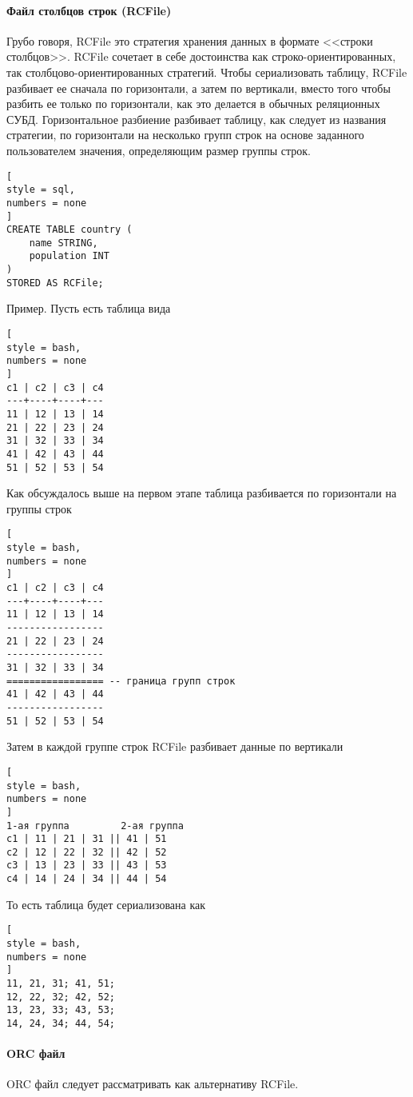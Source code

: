 \documentclass[%
	11pt,
	a4paper,
	utf8,
		]{article}
\begin{document}
\paragraph{Файл столбцов строк (RCFile)} Грубо говоря, RCFile это стратегия хранения данных в формате <<строки столбцов>>. RCFile сочетает в себе достоинства как строко-ориентированных, так столбцово-ориентированных стратегий. Чтобы сериализовать таблицу, RCFile разбивает ее сначала по горизонтали, а затем по вертикали, вместо того чтобы разбить ее только по горизонтали, как это делается в обычных реляционных СУБД. Горизонтальное разбиение разбивает таблицу, как следует из названия стратегии, по горизонтали на несколько групп строк на основе заданного пользователем значения, определяющим размер группы строк.
\begin{lstlisting}[
style = sql,
numbers = none	
]
CREATE TABLE country (
	name STRING,
	population INT
)
STORED AS RCFile;
\end{lstlisting}

Пример. Пусть есть таблица вида
\begin{lstlisting}[
style = bash,
numbers = none	
]
c1 | c2 | c3 | c4
---+----+----+---
11 | 12 | 13 | 14
21 | 22 | 23 | 24
31 | 32 | 33 | 34
41 | 42 | 43 | 44
51 | 52 | 53 | 54
\end{lstlisting}

Как обсуждалось выше на первом этапе таблица разбивается по горизонтали на группы строк
\begin{lstlisting}[
style = bash,
numbers = none	
]
c1 | c2 | c3 | c4
---+----+----+---
11 | 12 | 13 | 14
-----------------
21 | 22 | 23 | 24
-----------------
31 | 32 | 33 | 34
================= -- граница групп строк
41 | 42 | 43 | 44
-----------------
51 | 52 | 53 | 54
\end{lstlisting}

Затем в каждой группе строк RCFile разбивает данные по вертикали
\begin{lstlisting}[
style = bash,
numbers = none	
]
1-ая группа         2-ая группа
с1 | 11 | 21 | 31 || 41 | 51
c2 | 12 | 22 | 32 || 42 | 52
c3 | 13 | 23 | 33 || 43 | 53
c4 | 14 | 24 | 34 || 44 | 54
\end{lstlisting}

То есть таблица будет сериализована как
\begin{lstlisting}[
style = bash,
numbers = none	
]
11, 21, 31; 41, 51;
12, 22, 32; 42, 52;
13, 23, 33; 43, 53;
14, 24, 34; 44, 54;
\end{lstlisting}

\paragraph{ORC файл} ORC файл следует рассматривать как альтернативу RCFile.
\end{document}
